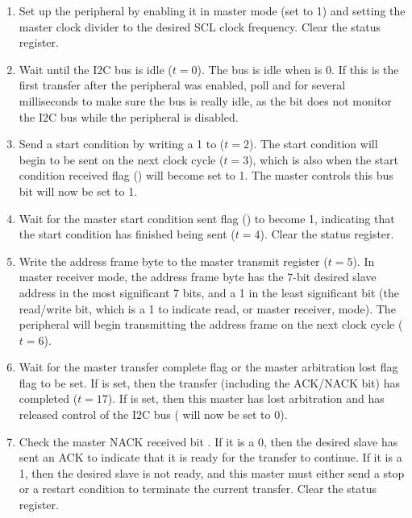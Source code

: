 \begin{enumerate}
	\item Set up the  peripheral by enabling it in master mode (set  to 1) and setting the master clock divider  to the desired SCL clock frequency. Clear the status register.
	\item Wait until the I2C bus is idle ($t = 0$). The bus is idle when  is 0. If this is the first transfer after the  peripheral was enabled, poll  and  for several milliseconds to make sure the bus is really idle, as the  bit does not monitor the I2C bus while the peripheral is disabled.
	\item \label{proc:i2c-master-receiver-send-start} Send a start condition by writing a 1 to  ($t = 2$). The start condition will begin to be sent on the next clock cycle ($t = 3$), which is also when the start condition received flag () will become set to 1. The master controls this bus bit  will now be set to 1.
	\item Wait for the master start condition sent flag () to become 1, indicating that the start condition has finished being sent ($t = 4$). Clear the status register.
	\item Write the address frame byte to the master transmit register  ($t = 5$). In master receiver mode, the address frame byte has the 7-bit desired slave address in the most significant 7 bits, and a 1 in the least significant bit (the read/write bit, which is a 1 to indicate read, or master receiver, mode). The  peripheral will begin transmitting the address frame on the next clock cycle ($t = 6$).
	\item Wait for the master transfer complete flag  or the master arbitration lost flag  flag to be set. If  is set, then the transfer (including the ACK/NACK bit) has completed ($t = 17$). If  is set, then this master has lost arbitration and has released control of the I2C bus ( will now be set to 0).
	\item Check the master NACK received bit . If it is a 0, then the desired slave has sent an ACK to indicate that it is ready for the transfer to continue. If it is a 1, then the desired slave is not ready, and this master must either send a stop or a restart condition to terminate the current transfer. Clear the status register.

\end{enumerate}
